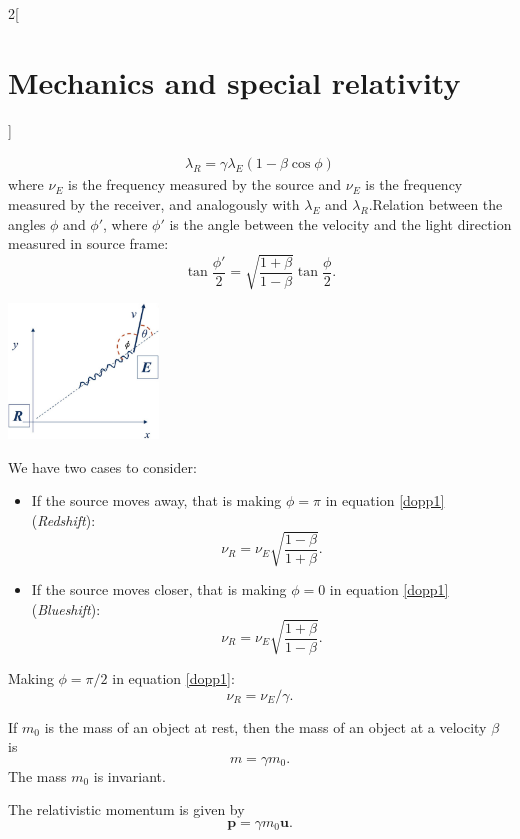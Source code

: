 \documentclass[../../../main.tex]{subfiles}
\begin{document}
\begin{multicols}{2}[\section{Mechanics and special relativity}]
\begin{concept}
\begin{gather}
    \lambda_R=\gamma\lambda_E(1-\beta\cos\phi)
\end{gather} where $\nu_E$ is the frequency measured by the source and $\nu_E$ is the frequency measured by the receiver, and analogously with $\lambda_E$ and $\lambda_R$.\newline Relation between the angles $\phi$ and $\phi'$, where $\phi'$ is the angle between the velocity and the light direction measured in source frame: 
$$\tan\frac{\phi'}{2}=\sqrt{\frac{1+\beta}{1-\beta}}\tan\frac{\phi}{2}.$$
\end{concept}
\begin{minipage}{\linewidth}
    \centering
    \includegraphics[width=4cm]{Physics/1st/Mechanics_and_special_relativity/Images/dop.jpg}
\end{minipage}
\begin{concept}
We have two cases to consider:
\begin{itemize}
    \item If the source moves away, that is making $\phi=\pi$ in equation \eqref{dopp1} (\textit{Redshift}):
   $$\nu_R=\nu_E\sqrt{\frac{1-\beta}{1+\beta}}.$$
    \item If the source moves closer, that is making $\phi=0$ in equation \eqref{dopp1} (\textit{Blueshift}):
   $$\nu_R=\nu_E\sqrt{\frac{1+\beta}{1-\beta}}.$$
\end{itemize}
\end{concept}
\begin{concept}
Making $\phi=\pi/2$ in equation \eqref{dopp1}:$$\nu_R=\nu_E/\gamma.$$
\end{concept}
\begin{concept}
If $m_0$ is the mass of an object at rest, then the mass of an object at a velocity $\beta$ is $$m=\gamma m_0.$$ The mass $m_0$ is invariant.
\end{concept}
\begin{concept}
The relativistic momentum is given by $$\boldsymbol{p}=\gamma m_0\boldsymbol{u}.$$

\end{concept}
\end{multicols}
\end{document}
